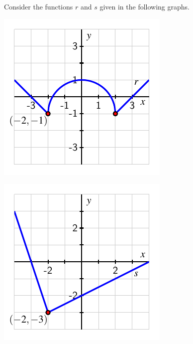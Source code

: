 \documentclass[handout, noauthor, nooutcomes]{ximera}
\begin{document}
\begin{exploration} %

Consider the functions \(r\) and \(s\) given in the following graphs.%
\begin{image}
\includegraphics[width=1\linewidth]{images/transformations-act-r-translation}

\includegraphics[width=1\linewidth]{images/transformations-act-s-translation}
\end{image}


\end{exploration}
\end{document}
